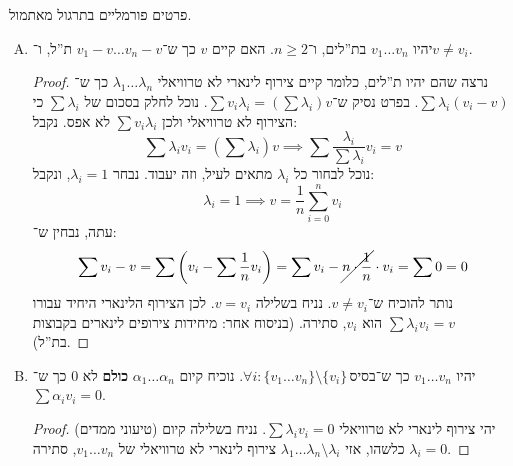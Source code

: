 \documentclass[]{article}
\newcommand\sumni     {\sum_{i = 0}^{n}}
\newcommand\co        {\colon}
\newcommand\ag        {\alpha}
\renewcommand\lg      {\lambda}
\newcommand\cl [1]    {\left ( #1 \right )}
\theoremstyle{definition}
\begin{document}
	\section{}
	פרטים פורמליים בתרגול מאתמול. 
	
	\begin{enumerate}[A.]
		\item יהיו $v_1 \dots v_n$ בת''לים, ו־$n \ge 2$. האם קיים $v$ כך ש־$v_1 - v \dots v_n - v$ ת''ל, ו־$v \neq v_i$. \begin{proof}
			נרצה שהם יהיו ת''לים, כלומר קיים צירוף לינארי לא טרוויאלי $\lg_1 \dots \lg_n$ כך ש־$\sum \lg_i(v_i -v)$. בפרט נסיק ש־$\sum v_i \lg_i = \cl{\sum \lg_i}v$. נוכל לחלק בסכום של $\sum\lg_i$ כי הצירוף לא טרוויאלי ולכן $\sum v_i \lg_i$ לא אפס. נקבל: 
			\[ \sum \lg_i v_i = (\sum \lg_i)v \implies \sum \frac{\lg_i}{\sum \lg_i}v_i = v \]
			נוכל לבחור כל $\lg_i$ מתאים לעיל, וזה יעבוד. נבחר $\lg_i = 1$, ונקבל: 
			\[ \lg_i = 1 \implies v = \frac{1}{n}\sumni v_i \]
			עתה, נבחין ש־: 
			\[ \sum v_i - v = \sum \cl{v_i - \sum\frac{1}{n}v_i} = \sum v_i - \cancel{n \cdot \frac{1}{n}} \cdot v_i = \sum0 = 0 \]
			נותר להוכיח ש־$v \neq v_i$. נניח בשלילה  $v = v_i$. לכן הצירוף הלינארי היחיד עבורו $\sum \lg_i v_i = v$ הוא $v_i$, סתירה. (בניסוח אחר: מיחידות צירופים לינארים בקבוצות בת''ל). 
		\end{proof}
		\item יהיו $v_1 \dots v_n$ כך ש־$\forall i \co \{v_1 \dots v_n\} \setminus \{v_i\} \,\text{בסיס}$. נוכיח קיום $\ag_1 \dots \ag_n$ \textbf{כולם} לא $0$ כך ש־$\sum \ag_i v_i = 0$. 
		
		\begin{proof}
			(טיעוני ממדים) יהי צירוף לינארי לא טרוויאלי $\sum \lg_i v_i = 0$. נניח בשלילה קיום $\lg_i = 0$ כלשהו, אזי $\lg_1 \dots \lg_n \setminus \lg_i$ צירוף לינארי לא טרוויאלי של $v_1 \dots v_n$, סתירה. 
		\end{proof}
	\end{enumerate}
	
\end{document}
